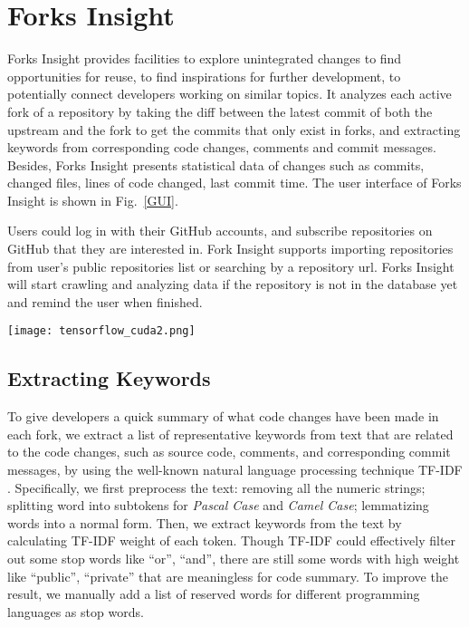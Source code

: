 \section{Forks Insight}

Forks Insight provides facilities to explore unintegrated changes to find opportunities for reuse, to find inspirations for further development, to potentially connect developers working on similar topics.
%
It analyzes each active fork of a repository by taking the diff between the latest commit of both the upstream and the fork to get the commits that only exist in forks, and extracting keywords from corresponding code changes, comments and commit messages.
%
Besides, Forks Insight presents statistical data of changes such as commits, changed files, lines of code changed, last commit time. The user interface of Forks Insight is shown in Fig.~\ref{GUI}.

Users could log in with their GitHub accounts, and subscribe repositories on GitHub that they are interested in. Fork Insight supports importing repositories from user's public repositories list or searching by a repository url. Forks Insight will start crawling and analyzing data if the repository is not in the database yet and remind the user when finished.

\begin{figure*}[ht]
\begin{centering}
\texttt{[image: tensorflow\_cuda2.png]}
\caption{User Interface of Forks Insight. This example shows searching ``cuda'' in repository of \emph{tensorflow/tensorflow}.}
\vspace{-3pt}
\label{GUI}
\end{centering}
\end{figure*}

\subsection{Extracting Keywords}
To give developers a quick summary of what code changes have been made in each fork, we extract a list of representative keywords from text that are related to the code changes, such as source code, comments, and corresponding commit messages, by using the well-known natural language processing technique TF-IDF \cite{salton1988term}. Specifically, we first preprocess the text: removing all the numeric strings; splitting word into subtokens for \emph{Pascal Case} and \emph{Camel Case}; lemmatizing words into a normal form. Then, we extract keywords from the text by calculating TF-IDF weight of each token. Though TF-IDF could effectively filter out some stop words like ``or'', ``and'', there are still some words with high weight like ``public'', ``private'' that are meaningless for code summary. To improve the result, we manually add a list of  reserved words for different programming languages as stop words.


